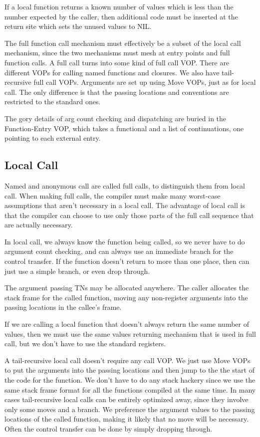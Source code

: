 {\begin{itemize, spread 0, spacing 1}
If a local function returns a known number of values which is less than the
number expected by the caller, then additional code must be inserted at the
return site which sets the unused values to NIL.

The full function call mechanism must effectively be a subset of the local call
mechanism, since the two mechanisms must mesh at entry points and full function
calls.  A full call turns into some kind of full call VOP.  There are different
VOPs for calling named functions and closures.  We also have tail-recursive
full call VOPs.  Arguments are set up using Move VOPs, just as for local call.
The only difference is that the passing locations and conventions are
restricted to the standard ones.

The gory details of arg count checking and dispatching are buried in the
Function-Entry VOP, which takes a functional and a list of continuations, one
pointing to each external entry.

\subsection{Local Call}

Named and anonymous call are called full calls, to distinguish them from
local call.  When making full calls, the compiler must make many worst-case
assumptions that aren't necessary in a local call.  The advantage of local
call is that the compiler can choose to use only those parts of the full
call sequence that are actually necessary. 

In local call, we always know the function being called, so we never have
to do argument count checking, and can always use an immediate branch for
the control transfer.  If the function doesn't return to more than one
place, then can just use a simple branch, or even drop through.

The argument passing TNs may be allocated anywhere.  The caller allocates the
stack frame for the called function, moving any non-register arguments into the
passing locations in the callee's frame.

If we are calling a local function that doesn't always return the same
number of values, then we must use the same values returning mechanism that
is used in full call, but we don't have to use the standard registers.

A tail-recursive local call doesn't require any call VOP.  We just use Move
VOPs to put the arguments into the passing locations and then jump to the the
start of the code for the function.  We don't have to do any stack hackery
since we use the same stack frame format for all the functions compiled at the
same time.  In many cases tail-recursive local calls can be entirely optimized
away, since they involve only some moves and a branch.  We preference the
argument values to the passing locations of the called function, making it
likely that no move will be necessary.  Often the control transfer can be done
by simply dropping through.


\end{itemize, spread 0, spacing 1}}
